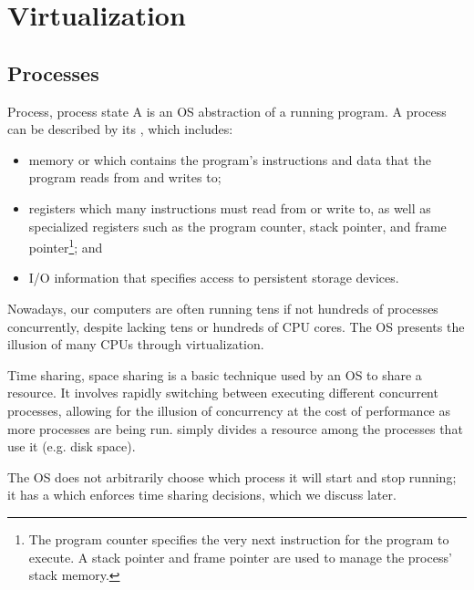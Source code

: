 \chapter{Virtualization}

\section{Processes}

\begin{dfnbox}{Process, process state}{}
    A  is an OS abstraction of a running program. A process can be described by its , which includes:
    \begin{itemize}
        \item memory or  which contains the program's instructions and data that the program reads from and writes to;
        \item registers which many instructions must read from or write to, as well as specialized registers such as the program counter, stack pointer, and frame pointer\footnote{The program counter specifies the very next instruction for the program to execute. A stack pointer and frame pointer are used to manage the process' stack memory.}; and
        \item I/O information that specifies access to persistent storage devices.
    \end{itemize}
\end{dfnbox}

Nowadays, our computers are often running tens if not hundreds of processes concurrently, despite lacking tens or hundreds of CPU cores. The OS presents the illusion of many CPUs through virtualization.

\begin{dfnbox}{Time sharing, space sharing}{}
     is a basic technique used by an OS to share a resource. It involves rapidly switching between executing different concurrent processes, allowing for the illusion of concurrency at the cost of performance as more processes are being run.  simply divides a resource among the processes that use it (e.g. disk space).
\end{dfnbox}

The OS does not arbitrarily choose which process it will start and stop running; it has a  which enforces time sharing decisions, which we discuss later.

